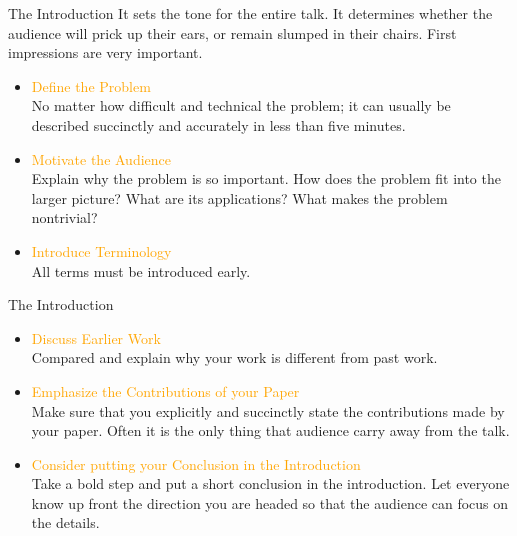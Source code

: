 \documentclass[
 size=14pt,
 paper=smartboard,  %
 mode=present, 		%
 display=slides, 	%
 style=tuliplab,  	%
 pauseslide,
 fleqn,leqno]{powerdot}
\begin{document}
\begin{slide}{The Introduction}
It sets the tone for the entire talk.
It determines whether the audience will prick up their ears,
or remain slumped in their chairs.
First impressions are very important.
\begin{itemize}
  \item \textcolor{orange}{Define the Problem}\\
  No matter how difficult and technical the problem;
  it can usually be described succinctly and
  accurately in less than five minutes.
  \item \textcolor{orange}{Motivate the Audience}\\
  Explain why the problem is so important.
  How does the problem fit into the larger picture?
  What are its applications?
  What makes the problem nontrivial?
  \item \textcolor{orange}{Introduce Terminology}\\
  All terms must be introduced early.
\end{itemize}
\end{slide}

\begin{slide}[toc=,bm=]{The Introduction}
\begin{itemize}

    \item \textcolor{orange}{Discuss Earlier Work}\\
      Compared and explain why your work is different
      from past work.

    \item \textcolor{orange}{Emphasize the Contributions of your Paper}\\
      Make sure that you explicitly and succinctly state the
      contributions made by your paper.
      Often it is the only thing that audience carry
      away from the talk.

    \item \textcolor{orange}{Consider putting your Conclusion in the Introduction}  \\
        Take a bold step and put a short conclusion
        in the introduction.
        Let everyone know up front the direction
        you are headed so that the audience can
         focus on the details.
\end{itemize}
\end{slide}
\end{document}

